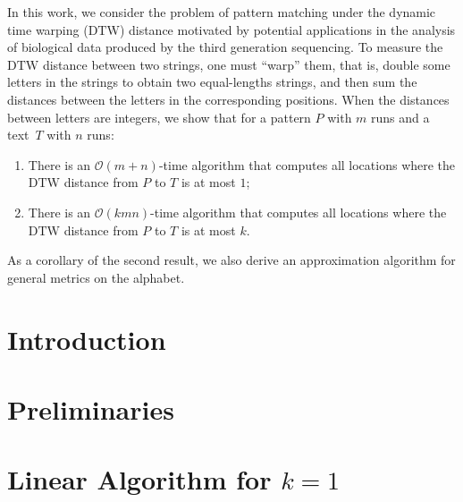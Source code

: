 
\providecommand{\norm}[1]{\ensuremath{\lVert#1\rVert}}
\providecommand{\ceil}[1]{\ensuremath{\lceil#1\rceil}}
\newcommand{\dtw}{\mathrm{DTW}}
\newcommand{\ham}{\mathrm{HAM}}
\providecommand{\dd}{\mathinner{.\,.\allowbreak}}
\providecommand{\RLE}{\mathrm{RLE}}
\providecommand{\Oh}{\mathcal{O}}
\providecommand{\eps}{\varepsilon}
\newcommand{\invacker}{\alpha}

\newcommand{\inputDTW}[1]{}
\newcommand{\figDTW}[2]{\texttt{[image: Part\_Two/dtw/\#2]}}

\begin{small}
In this work, we consider the problem of pattern matching under the dynamic time warping ($\dtw$) distance motivated by potential applications in the analysis of biological data produced by the third generation sequencing. To measure the $\dtw$ distance between two strings, one must ``warp'' them, that is, double some letters in the strings to obtain two equal-lengths strings, and then sum the distances between the letters in the corresponding positions. When the distances between letters are integers, we show that for a pattern $P$ with $m$ runs and a text~$T$ with $n$ runs:
\begin{enumerate}
\item There is an $\Oh(m+n)$-time algorithm that computes all locations where the $\dtw$ distance from $P$ to $T$ is at most $1$;
\item There is an $\Oh(kmn)$-time algorithm that computes all locations where the $\dtw$ distance from $P$ to $T$ is at most $k$.
\end{enumerate}
As a corollary of the second result, we also derive an approximation algorithm for general metrics on the alphabet. 
\end{small}

\section{Introduction}
\inputDTW{intro}

\section{Preliminaries}\label{dtw:sec:prelim}
\inputDTW{prelim}

\section{Linear Algorithm for \texorpdfstring{$k=1$}{kone}}
\label{dtw:sec:lce}
\inputDTW{lce}

